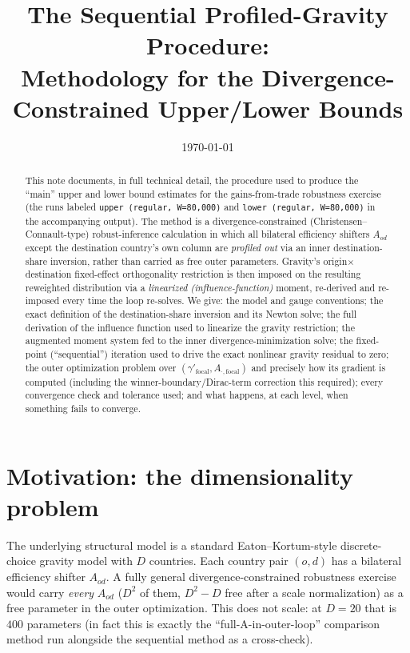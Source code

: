 \documentclass[11pt]{article}
\title{The Sequential Profiled-Gravity Procedure:\\ Methodology for the Divergence-Constrained Upper/Lower Bounds}
\author{}
\date{\today}
\begin{document}
\maketitle

\begin{abstract}
This note documents, in full technical detail, the procedure used to produce the ``main'' upper
and lower bound estimates for the gains-from-trade robustness exercise (the runs labeled
\texttt{upper (regular, W=80{,}000)} and \texttt{lower (regular, W=80{,}000)} in the accompanying
output). The method is a divergence-constrained (Christensen--Connault-type) robust-inference
calculation in which all bilateral efficiency shifters $A_{od}$ except the destination country's
own column are \emph{profiled out} via an inner destination-share inversion, rather than carried as
free outer parameters. Gravity's origin$\times$destination fixed-effect orthogonality restriction is
then imposed on the resulting reweighted distribution via a \emph{linearized (influence-function)}
moment, re-derived and re-imposed every time the loop re-solves. We give: the model and gauge
conventions; the exact definition of the destination-share inversion and its Newton solve; the full
derivation of the influence function used to linearize the gravity restriction; the augmented
moment system fed to the inner divergence-minimization solve; the fixed-point (``sequential'')
iteration used to drive the exact nonlinear gravity residual to zero; the outer optimization problem
over $(\gamma'_{\text{focal}}, A_{\cdot,\text{focal}})$ and precisely how its gradient is computed
(including the winner-boundary/Dirac-term correction this required); every convergence check and
tolerance used; and what happens, at each level, when something fails to converge.
\end{abstract}

\tableofcontents

\section{Motivation: the dimensionality problem}
\label{sec:motivation}

The underlying structural model is a standard Eaton--Kortum-style discrete-choice gravity model
with $D$ countries. Each country pair $(o,d)$ has a bilateral efficiency shifter $A_{od}$. A
fully general divergence-constrained robustness exercise would carry \emph{every} $A_{od}$ ($D^2$
of them, $D^2-D$ free after a scale normalization) as a free parameter in the outer optimization.
This does not scale: at $D=20$ that is $400$ parameters (in fact this is exactly the ``full-A-in-outer-loop''
comparison method run alongside the sequential method as a cross-check).
\end{document}
